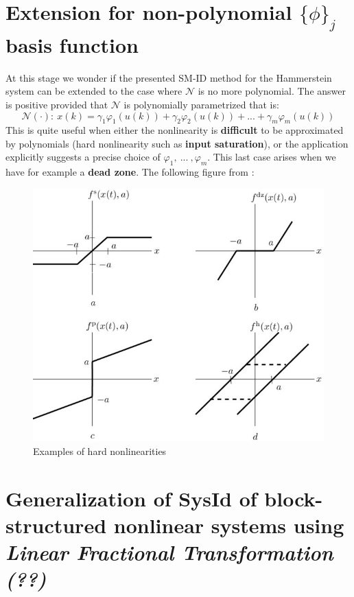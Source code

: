 \section{Extension for non-polynomial $\{\phi\}_j$ basis function}
At this stage we wonder if the presented SM-ID method for the Hammerstein system can be extended to the case where $\mathcal{N}$ is no more polynomial. The answer is positive provided that $\mathcal{N}$ is polynomially parametrized that is: 
\begin{equation}
    \mathcal{N}(\cdot): \ x(k)=\gamma_1{\varphi_1(u(k))}+\gamma_2{\varphi_2(u(k))}+...+\gamma_m{\varphi_m(u(k))}
\end{equation}
This is quite useful when either the nonlinearity is \textbf{difficult} to be approximated by polynomials (hard nonlinearity such as \textbf{input saturation}), or the application explicitly suggests a precise choice of $\varphi_1, \ ... \ , \varphi_m$. This last case arises when we have for example a \textbf{dead zone}.
The following figure from \cite{pupeikis2003identification}: 
\begin{figure}[h]
    \centering
    \includegraphics[scale=1.2]{img/hardNL.jpg}
    \caption{Examples of hard nonlinearities}
\end{figure} 

\section{Generalization of SysId of block-structured nonlinear systems using \textit{Linear Fractional Transformation (??)}}
